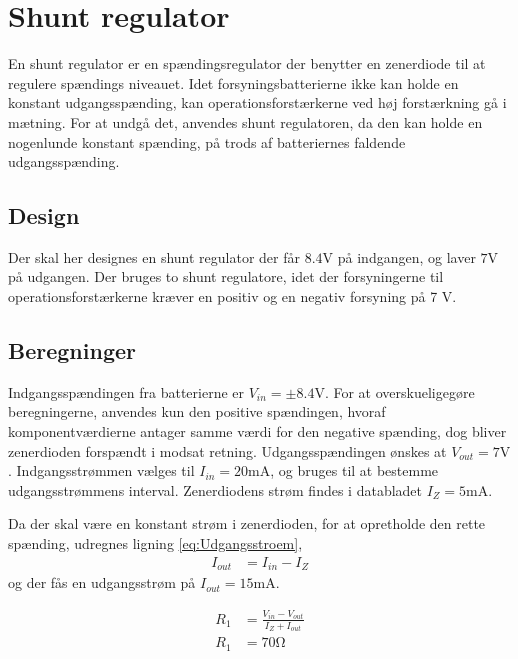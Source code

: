 \section{Shunt regulator}\label{sec:shunt}
En shunt regulator er en spændingsregulator der benytter en zenerdiode til at regulere spændings niveauet.
Idet forsyningsbatterierne ikke kan holde en konstant udgangsspænding, kan operationsforstærkerne ved høj forstærkning gå i mætning. 
For at undgå det, anvendes shunt regulatoren, da den kan holde en nogenlunde konstant spænding, på trods af batteriernes faldende udgangsspænding.

\subsection{Design}
Der skal her designes en shunt regulator der får $8.4 \si{\volt}$ på indgangen, og laver $7\si{\volt}$ på udgangen.
Der bruges to shunt regulatore, idet der forsyningerne til operationsforstærkerne kræver en positiv og en negativ forsyning på 7 \si{\volt}.

\subsection{Beregninger}
Indgangsspændingen fra batterierne er $V_{in} = \pm 8.4 \si{\volt}$. 
For at overskueligegøre beregningerne, anvendes kun den positive spændingen, hvoraf komponentværdierne antager samme værdi for den negative spænding, dog bliver zenerdioden forspændt i modsat retning.
Udgangsspændingen ønskes at $V_{out} = 7 \si{\volt}$. 
Indgangsstrømmen vælges til $I_{in} = 20\si{\milli\ampere}$, og bruges til at bestemme udgangsstrømmens interval.
Zenerdiodens strøm findes i databladet $I_Z = 5 \si{\milli\ampere}$.

Da der skal være en konstant strøm i zenerdioden, for at opretholde den rette spænding, udregnes ligning \ref{eq:Udgangsstroem},
\begin{align}
	I_{out} & = I_{in} - I_Z \label{eq:Udgangsstroem}
\end{align}
og der fås en udgangsstrøm på $I_{out} = 15 \si{\milli\ampere}$.

\begin{align}
	R_1 & = \frac{V_{in} - V_{out}}{I_Z + I_{out}} \label{eq:RegulatorModstand} \\
	R_1 & = 70 \si{\ohm} \nonumber \label{eq:RegulatorModstandBeregnet}
\end{align}

